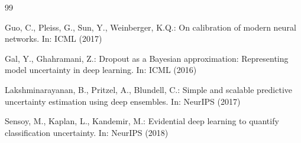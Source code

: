 \documentclass[runningheads]{llncs}
\begin{document}
\begin{thebibliography}{99}

Guo, C., Pleiss, G., Sun, Y., Weinberger, K.Q.: On calibration of modern
neural networks. In: ICML (2017)

Gal, Y., Ghahramani, Z.: Dropout as a Bayesian approximation:
Representing model uncertainty in deep learning. In: ICML (2016)

Lakshminarayanan, B., Pritzel, A., Blundell, C.: Simple and scalable
predictive uncertainty estimation using deep ensembles. In: NeurIPS (2017)

Sensoy, M., Kaplan, L., Kandemir, M.: Evidential deep learning to
quantify classification uncertainty. In: NeurIPS (2018)

\end{thebibliography}
\end{document}
